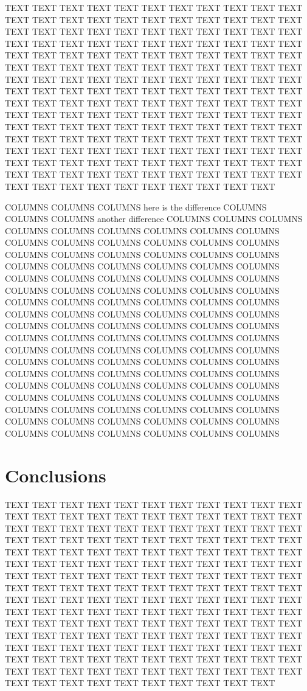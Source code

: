 \documentclass{article}
\begin{document}
TEXT TEXT TEXT TEXT TEXT TEXT TEXT TEXT TEXT TEXT TEXT TEXT TEXT TEXT TEXT TEXT TEXT TEXT TEXT TEXT TEXT TEXT TEXT TEXT TEXT TEXT TEXT TEXT TEXT TEXT TEXT TEXT TEXT TEXT TEXT TEXT TEXT TEXT TEXT TEXT TEXT TEXT TEXT TEXT TEXT TEXT TEXT TEXT TEXT TEXT TEXT TEXT TEXT TEXT TEXT TEXT TEXT TEXT TEXT TEXT TEXT TEXT TEXT TEXT TEXT TEXT TEXT TEXT TEXT TEXT TEXT TEXT TEXT TEXT TEXT TEXT TEXT TEXT TEXT TEXT TEXT TEXT TEXT TEXT TEXT TEXT TEXT TEXT TEXT TEXT TEXT TEXT TEXT TEXT TEXT TEXT TEXT TEXT TEXT TEXT TEXT TEXT TEXT TEXT TEXT TEXT TEXT TEXT TEXT TEXT TEXT TEXT TEXT TEXT TEXT TEXT TEXT TEXT TEXT TEXT TEXT TEXT TEXT TEXT TEXT TEXT TEXT TEXT TEXT TEXT TEXT TEXT TEXT TEXT TEXT TEXT TEXT TEXT TEXT TEXT TEXT TEXT TEXT TEXT TEXT TEXT TEXT TEXT TEXT TEXT TEXT TEXT TEXT TEXT TEXT TEXT TEXT TEXT TEXT TEXT TEXT TEXT TEXT TEXT TEXT TEXT TEXT TEXT TEXT TEXT TEXT TEXT TEXT TEXT TEXT 
\begin{multicols}{2}
\noindent COLUMNS COLUMNS COLUMNS here is the difference COLUMNS COLUMNS COLUMNS another difference COLUMNS COLUMNS COLUMNS COLUMNS COLUMNS COLUMNS COLUMNS COLUMNS COLUMNS COLUMNS COLUMNS COLUMNS COLUMNS COLUMNS COLUMNS COLUMNS COLUMNS COLUMNS COLUMNS COLUMNS COLUMNS COLUMNS COLUMNS COLUMNS COLUMNS COLUMNS COLUMNS COLUMNS COLUMNS COLUMNS COLUMNS COLUMNS COLUMNS COLUMNS COLUMNS COLUMNS COLUMNS COLUMNS COLUMNS COLUMNS COLUMNS COLUMNS COLUMNS COLUMNS COLUMNS COLUMNS COLUMNS COLUMNS COLUMNS COLUMNS COLUMNS COLUMNS COLUMNS COLUMNS COLUMNS COLUMNS COLUMNS COLUMNS COLUMNS COLUMNS COLUMNS COLUMNS COLUMNS COLUMNS COLUMNS COLUMNS COLUMNS COLUMNS COLUMNS COLUMNS COLUMNS COLUMNS COLUMNS COLUMNS COLUMNS COLUMNS COLUMNS COLUMNS COLUMNS COLUMNS COLUMNS COLUMNS COLUMNS COLUMNS COLUMNS COLUMNS COLUMNS COLUMNS COLUMNS COLUMNS COLUMNS COLUMNS COLUMNS COLUMNS COLUMNS COLUMNS COLUMNS COLUMNS COLUMNS COLUMNS COLUMNS COLUMNS COLUMNS COLUMNS COLUMNS COLUMNS COLUMNS COLUMNS COLUMNS COLUMNS COLUMNS 
\end{multicols}

\section{Conclusions}
TEXT TEXT TEXT TEXT TEXT TEXT TEXT TEXT TEXT TEXT TEXT TEXT TEXT TEXT TEXT TEXT TEXT TEXT TEXT TEXT TEXT TEXT TEXT TEXT TEXT TEXT TEXT TEXT TEXT TEXT TEXT TEXT TEXT TEXT TEXT TEXT TEXT TEXT TEXT TEXT TEXT TEXT TEXT TEXT TEXT TEXT TEXT TEXT TEXT TEXT TEXT TEXT TEXT TEXT TEXT TEXT TEXT TEXT TEXT TEXT TEXT TEXT TEXT TEXT TEXT TEXT TEXT TEXT TEXT TEXT TEXT TEXT TEXT TEXT TEXT TEXT TEXT TEXT TEXT TEXT TEXT TEXT TEXT TEXT TEXT TEXT TEXT TEXT TEXT TEXT TEXT TEXT TEXT TEXT TEXT TEXT TEXT TEXT TEXT TEXT TEXT TEXT TEXT TEXT TEXT TEXT TEXT TEXT TEXT TEXT TEXT TEXT TEXT TEXT TEXT TEXT TEXT TEXT TEXT TEXT TEXT TEXT TEXT TEXT TEXT TEXT TEXT TEXT TEXT TEXT TEXT TEXT TEXT TEXT TEXT TEXT TEXT TEXT TEXT TEXT TEXT TEXT TEXT TEXT TEXT TEXT TEXT TEXT TEXT TEXT TEXT TEXT TEXT TEXT TEXT TEXT TEXT TEXT TEXT TEXT TEXT TEXT TEXT TEXT TEXT TEXT TEXT TEXT TEXT TEXT TEXT TEXT TEXT TEXT TEXT 
\end{document}
